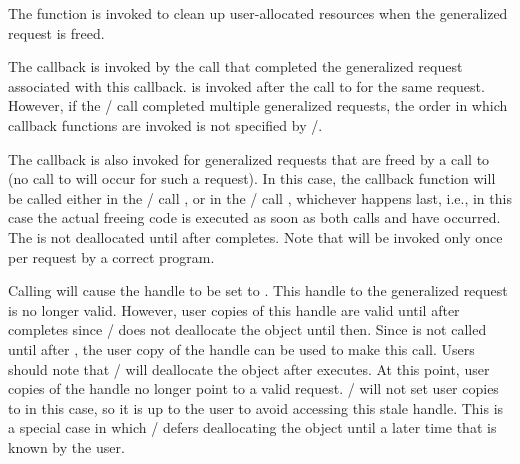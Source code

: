 \par\noindent
The  function is invoked to clean up user-allocated
resources when the generalized request is freed. 

The  callback is invoked by the 
%
%
%
%
%
%
%
%
 call that
completed the generalized request associated with this
callback.  is invoked after the call to
 for the same request.  However, if the \MPI/ call
completed multiple generalized requests, the order in which
 callback functions are invoked is not specified by
\MPI/.
 
The  callback 
is also invoked for generalized requests that are freed by a call to
 (no call to 
%
%
%
%
%
%
%
%
will occur for
such a request).  In this case, the callback
function will be called either in the \MPI/ call
, or in the \MPI/ call
, whichever happens 
last, i.e., 
in this case the actual freeing code is executed
as soon as both calls  and
 have occurred. 
The  is not deallocated until after
 completes.
Note that  will be 
invoked only once per request by a correct program. 

\begin{users}
Calling  will cause the
 handle to be set to .
This handle to the generalized request is no longer valid.  However,
user copies of this handle are valid until after
 completes since \MPI/ does not deallocate the object
until then.  Since  is not
called until after , the user copy of
the handle can be used to make this call.  Users should note that
\MPI/ will deallocate the object after 
executes.  At this point, user copies of the  handle no
longer point to a valid request.  \MPI/ will not set user copies to
 in this case, so it is up to the user to
avoid accessing this stale handle.  This is a special case in which \mpi/
defers deallocating the object until a later time that is known by
the user.
\end{users}

